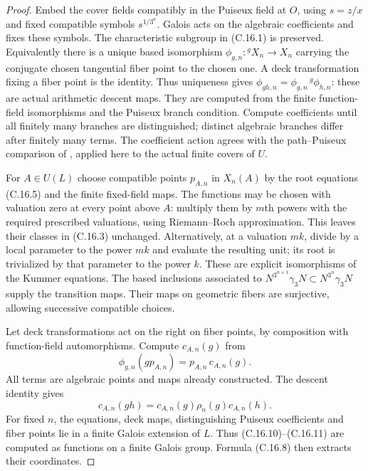 \begin{proof}
Embed the cover fields compatibly in the Puiseux
field at $O$, using $s=z/x$ and fixed compatible
symbols $s^{1/3^a}$.  Galois acts on the algebraic
coefficients and fixes these symbols.
The characteristic subgroup in (C.16.1) is
preserved.  Equivalently there is a unique based
isomorphism $\phi_{g,n}:{}^gX_n\to X_n$ carrying
the conjugate chosen tangential fiber point to
the chosen one.  A deck transformation fixing a
fiber point is the identity.  Thus uniqueness
gives
$\phi_{gh,n}=\phi_{g,n}\,{}^g\phi_{h,n}$:
these are actual arithmetic descent maps.
They are computed from the finite function-field
isomorphisms and the Puiseux branch condition.
Compute coefficients until all finitely many
branches are distinguished; distinct algebraic
branches differ after finitely many terms.
The coefficient action agrees with the
path--Puiseux comparison of
\cite[\S1.1, (1.1.1)--(1.1.3)]{BC_HiranoMorishita2019},
applied here to the actual finite covers of $U$.

For $A\in U(L)$ choose compatible points $p_{A,n}$
in $X_n(A)$ by the root equations (C.16.5) and
the finite fixed-field maps.  The functions may
be chosen with valuation zero at every point
above $A$: multiply them by $m$th powers with
the required prescribed valuations, using
Riemann--Roch approximation.  This leaves their
classes in (C.16.3) unchanged.  Alternatively,
at a valuation $mk$, divide by a local parameter
to the power $mk$ and evaluate the resulting
unit; its root is trivialized by that parameter
to the power $k$.  These are explicit
isomorphisms of the Kummer equations.
The based inclusions associated to
$N^{3^{n+1}}\gamma_3N\subset N^{3^n}\gamma_3N$
supply the transition maps.  Their maps on
geometric fibers are surjective, allowing
successive compatible choices.

Let deck transformations act on the right on
fiber points, by composition with function-field
automorphisms.  Compute $c_{A,n}(g)$ from
\[
 \phi_{g,n}(g p_{A,n})=p_{A,n}\,c_{A,n}(g).                 \tag{C.16.10}
\]
All terms are algebraic points and maps already
constructed.  The descent identity gives
\[
 c_{A,n}(gh)=c_{A,n}(g)\rho_n(g)c_{A,n}(h).                 \tag{C.16.11}
\]
For fixed $n$, the equations, deck maps,
distinguishing Puiseux coefficients and fiber
points lie in a finite Galois extension of $L$.
Thus (C.16.10)--(C.16.11) are computed as
functions on a finite Galois group.
Formula (C.16.8) then extracts their coordinates.


\end{proof}

